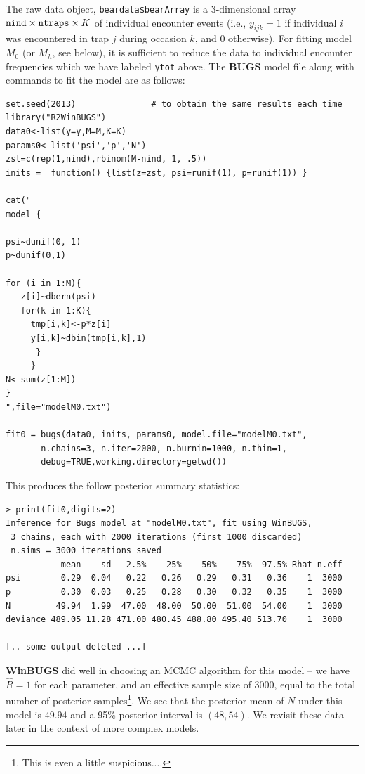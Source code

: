 The raw data object, \mbox{\tt beardata\$bearArray} is a 3-dimensional
array $\mbox{\tt nind} \times \mbox{\tt ntraps} \times K$ of
individual encounter events (i.e., $y_{ijk} = 1$ if individual $i$ was
encountered in trap $j$ during occasion $k$, and 0 otherwise).  For
fitting model $M_{0}$ (or $M_{h}$, see below), it is sufficient to
reduce the data to individual encounter frequencies which we have
labeled \mbox{\tt ytot} above.  The {\bf BUGS} model file along with
commands to fit the model are as follows:

{\small
\begin{verbatim}
set.seed(2013)               # to obtain the same results each time
library("R2WinBUGS")
data0<-list(y=y,M=M,K=K)
params0<-list('psi','p','N')
zst=c(rep(1,nind),rbinom(M-nind, 1, .5))
inits =  function() {list(z=zst, psi=runif(1), p=runif(1)) }

cat("
model {

psi~dunif(0, 1)
p~dunif(0,1)

for (i in 1:M){
   z[i]~dbern(psi)
   for(k in 1:K){
     tmp[i,k]<-p*z[i]
     y[i,k]~dbin(tmp[i,k],1)
      }
     }
N<-sum(z[1:M])
}
",file="modelM0.txt")

fit0 = bugs(data0, inits, params0, model.file="modelM0.txt",
       n.chains=3, n.iter=2000, n.burnin=1000, n.thin=1,
       debug=TRUE,working.directory=getwd())
\end{verbatim}
}
This produces the follow posterior
 summary statistics:
{\small
\begin{verbatim}
> print(fit0,digits=2)
Inference for Bugs model at "modelM0.txt", fit using WinBUGS,
 3 chains, each with 2000 iterations (first 1000 discarded)
 n.sims = 3000 iterations saved
           mean    sd   2.5%    25%    50%    75%  97.5% Rhat n.eff
psi        0.29  0.04   0.22   0.26   0.29   0.31   0.36    1  3000
p          0.30  0.03   0.25   0.28   0.30   0.32   0.35    1  3000
N         49.94  1.99  47.00  48.00  50.00  51.00  54.00    1  3000
deviance 489.05 11.28 471.00 480.45 488.80 495.40 513.70    1  3000

[.. some output deleted ...]
\end{verbatim}
}
{\bf WinBUGS} did well in choosing an MCMC algorithm for this model --
we have $\hat{R} = 1$ for each parameter, and an effective sample size
of 3000, equal to the total number of posterior samples\footnote{This is even a little
suspicious....}.
We see that the posterior mean of $N$ under this
model is $49.94$ and a 95\% posterior interval is $(48,54)$.  We
revisit these data later in the context of more complex models.


